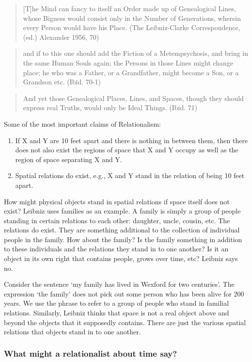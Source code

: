\documentclass[oneside]{article}
\begin{document}
\begin{quote}
{[}T{]}he Mind can fancy to itself an Order made up of Genealogical
Lines, whose Bigness would consist only in the Number of Generations,
wherein every Person would have his Place. (The Leibniz-Clarke
Correspondence, (ed.) Alexander 1956, 70)
\end{quote}

\begin{quote}
and if to this one should add the Fiction of a Metempsychosis, and bring
in the same Human Souls again; the Persons in those Lines might change
place; he who was a Father, or a Grandfather, might become a Son, or a
Grandson etc. (Ibid. 70-1)
\end{quote}

\begin{quote}
And yet those Genealogical Places, Lines, and Spaces, though they should
express real Truths, would only be Ideal Things. (Ibid. 71)
\end{quote}
Some of the most important claims of Relationalism:
\begin{enumerate}
\item  If X and Y are 10 feet apart and there is nothing in between them, then there does not also exist the regions of space that X and Y occupy as well as the region of space separating X and Y.
\item Spatial relations do exist, e.g., X and Y stand in the relation of being 10 feet apart.
\end{enumerate}
How might physical objects stand in spatial relations if space itself does not exist? Leibniz uses families as an example. A family is simply a group of people standing in certain relations to each other: daughter, uncle, cousin, etc. The relations do exist. They are something additional to the collection of individual people in the family. How about the family? Is the family something in addition to these individuals and the relations they stand in to one another? Is it an
object in its own right that contains people, grows over time, etc? Leibniz says no.

Consider the sentence `my family has lived in Wexford for two
centuries'. The expression `the family' does not pick out some person
who has been alive for 200 years. We use the phrase to refer to a group
of people who stand in familial relations. Similarly, Leibniz thinks
that space is not a real object above and beyond the objects that it
supposedly contains. There are just the various spatial relations that
objects stand in to one another.

\subsubsection*{What might a relationalist about time say?}
\end{document}

